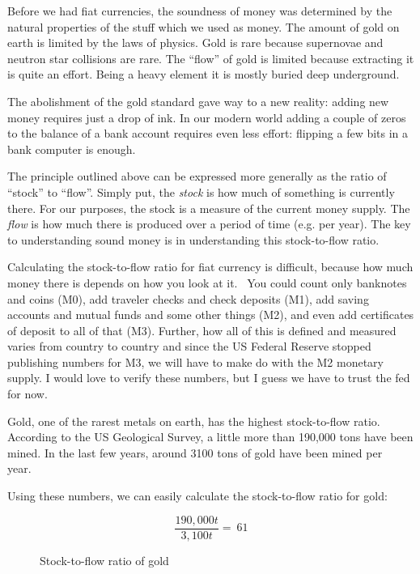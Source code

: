 Before we had fiat currencies, the soundness of money was determined by
the natural properties of the stuff which we used as money. The amount
of gold on earth is limited by the laws of physics. Gold is rare because
supernovae and neutron star collisions are rare. The \enquote{flow} of gold is
limited because extracting it is quite an effort. Being a heavy element
it is mostly buried deep underground.

The abolishment of the gold standard gave way to a new reality: adding new money
requires just a drop of ink. In our modern world adding a couple of zeros to the
balance of a bank account requires even less effort: flipping a few bits in a
bank computer is enough.


The principle outlined above can be expressed more generally as the
ratio of \enquote{stock} to \enquote{flow}. Simply put, the \textit{stock} is how much of
something is currently there. For our purposes, the stock is a measure
of the current money supply. The \textit{flow} is how much there is produced
over a period of time (e.g. per year). The key to understanding sound
money is in understanding this stock-to-flow ratio.

Calculating the stock-to-flow ratio for fiat currency is difficult, because how
much money there is depends on how you look at it.~\cite{wiki:money-supply} You
could count only banknotes and coins (M0), add traveler checks and check
deposits (M1), add saving accounts and mutual funds and some other things (M2),
and even add certificates of deposit to all of that (M3). Further, how all of
this is defined and measured varies from country to country and since the US
Federal Reserve stopped publishing \cite{web:fed-m3} numbers for M3, we will
have to make do with the M2 monetary supply. I would love to verify these
numbers, but I guess we have to trust the fed for now.

Gold, one of the rarest metals on earth, has the highest stock-to-flow
ratio. According to the US Geological Survey, a little more than 190,000
tons have been mined. In the last few years, around 3100 tons of gold
have been mined per year.~\cite{mineral-commodity-summaries}

Using these numbers, we can easily calculate the stock-to-flow ratio for
gold:

\begin{figure}
  \centering
  \begin{equation}
  \frac{190,000 t}{3,100 t} = ~ 61
  \end{equation}
  \caption{Stock-to-flow ratio of gold}
  \label{fig:stock-to-flow-gold}
\end{figure}

